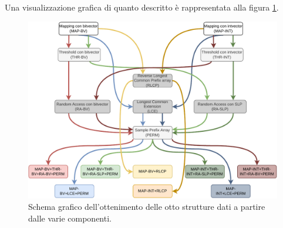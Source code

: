 Una visualizzazione grafica di quanto descritto è rappresentata alla figura
\ref{fig:compon}.
\begin{figure}
  \centering
  \includegraphics[width=\textwidth]{img/ds.pdf}
  \caption{Schema grafico dell'ottenimento delle otto strutture dati a partire
    dalle varie componenti.}
  \label{fig:compon}
\end{figure}
